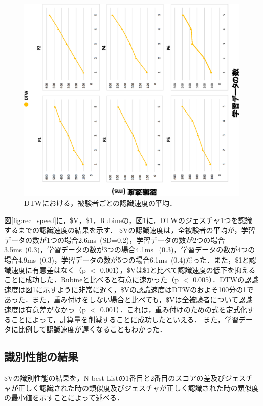 \begin{figure}[!h]
\centering
\includegraphics[width=1.0\columnwidth,angle=-90]{img/rec_speed_dtw.eps}
\caption{DTWにおける，被験者ごとの認識速度の平均．}
\label{fig:rec_speed_dtw}
\end{figure}

図\ref{fig:rec_speed}に，\$V，\$1，Rubineの，図\ref{fig:rec_speed_dtw}に，DTWのジェスチャ1つを認識するまでの認識速度の結果を示す．
\$Vの認識速度は，全被験者の平均が，学習データの数が1つの場合2.6ms~(SD=0.2)，学習データの数が2つの場合3.5ms~(0.3)，学習データの数が3つの場合4.1ms ~(0.3)，学習データの数が4つの場合4.9ms~(0.3)，学習データの数が5つの場合6.1ms~(0.4)だった．また，\$1と認識速度に有意差はなく（p $<$ 0.001），\$Vは\$1と比べて認識速度の低下を抑えることに成功した．Rubineと比べると有意に速かった（p $<$ 0.005）．DTWの認識速度は図\ref{fig:rec_speed_dtw}に示すように非常に遅く，\$Vの認識速度はDTWのおよそ100分の1であった．また，重み付けをしない場合と比べても，\$Vは全被験者について認識速度は有意差がなかっ（p $<$ 0.001）．これは，重み付けのための式を定式化することによって，計算量を削減することに成功したといえる．
また，学習データに比例して認識速度が遅くなることもわかった．

\clearpage
\subsection{識別性能の結果}
\$Vの識別性能の結果を，N-best Listの1番目と2番目のスコアの差及びジェスチャが正しく認識された時の類似度及びジェスチャが正しく認識された時の類似度の最小値を示すことによって述べる．


